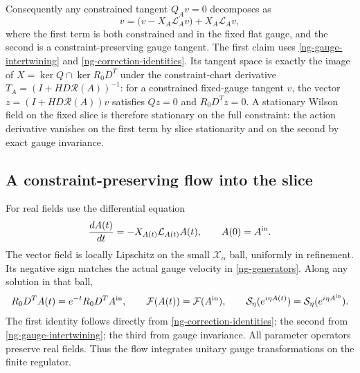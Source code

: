 \documentclass[11pt]{article}
\theoremstyle{remark}
\begin{document}
Consequently any constrained tangent $Q_Av=0$ decomposes as
\begin{equation}\label{ng-tangent-decomposition}
 v=\bigl(v-X_A\mathcal L_Av\bigr)+X_A\mathcal L_Av,
\end{equation}
where the first term is both constrained and in the fixed flat
gauge, and the second is a constraint-preserving gauge tangent.
The first claim uses \eqref{ng-gauge-intertwining} and
\eqref{ng-correction-identities}. Its tangent space is exactly the
image of $X=\ker Q\cap\ker R_0D^T$ under the constraint-chart
derivative $T_A=(I+H D\mathcal R(A))^{-1}$: for a constrained
fixed-gauge tangent $v$, the vector
$z=(I+H D\mathcal R(A))v$ satisfies $Qz=0$ and $R_0D^Tz=0$.
A stationary Wilson field on
the fixed slice is therefore stationary on the full constraint:
the action derivative vanishes on the first term by slice
stationarity and on the second by exact gauge invariance.

\subsection{A constraint-preserving flow into the slice}

For real fields use the differential equation
\begin{equation}\label{ng-flow}
 \frac{dA(t)}{dt}=-X_{A(t)}\mathcal L_{A(t)}A(t),
 \qquad A(0)=A^{\rm in}.
\end{equation}
The vector field is locally Lipschitz on the small
$\mathcal X_\alpha$ ball, uniformly in refinement. Its negative
sign matches the actual gauge velocity in
\eqref{ng-generators}. Along any solution in that ball,
\begin{equation}\label{ng-flow-identities}
 R_0D^TA(t)=e^{-t}R_0D^TA^{\rm in},\qquad
 \mathcal F(A(t))=\mathcal F(A^{\rm in}),\qquad
 \mathcal S_\eta(e^{i\eta A(t)})
             =\mathcal S_\eta(e^{i\eta A^{\rm in}}).
\end{equation}
The first identity follows directly from
\eqref{ng-correction-identities}; the second from
\eqref{ng-gauge-intertwining}; the third from gauge invariance.
All parameter operators preserve real fields. Thus the flow
integrates unitary gauge transformations on the finite regulator.
\end{document}
